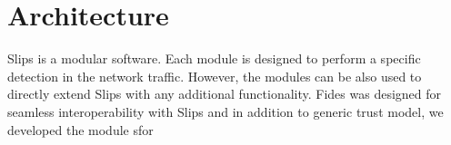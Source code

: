 \chapter{Architecture}
\label{ch:architecture}
Slips is a modular software. Each module is designed to perform a specific detection in the network traffic.\cite{slips}
However, the modules can be also used to directly extend Slips with any additional functionality. 
Fides was designed for seamless interoperability with Slips and in addition to generic trust model, we developed the module sfor 